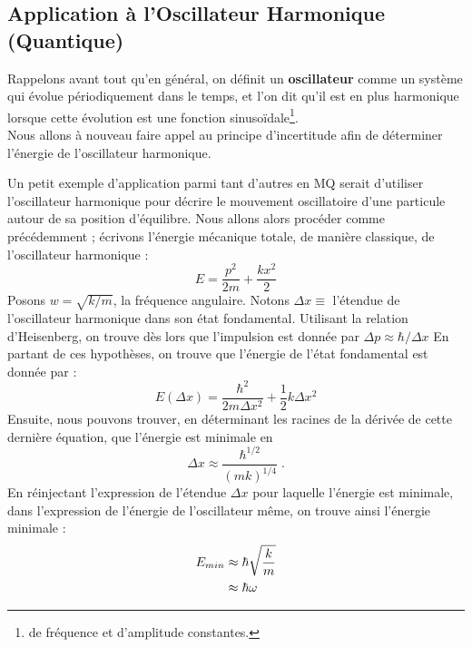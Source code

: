 \documentclass[../Notes de cours]{subfiles}
\begin{document}
\subsection{Application à l'Oscillateur Harmonique (Quantique) }
\label{Application à l'Oscillateur Harmonique Quantique}

Rappelons avant tout qu'en général, on définit un \textbf{oscillateur} comme un système qui évolue périodiquement dans le temps, et l'on dit qu'il est en plus harmonique lorsque cette évolution est une fonction sinusoïdale\footnote{de fréquence et d'amplitude constantes.}. \\
Nous allons à nouveau faire appel au principe d'incertitude afin de déterminer l'énergie de l'oscillateur harmonique. 


Un petit exemple d'application parmi tant d'autres en MQ serait d'utiliser l'oscillateur harmonique pour décrire le mouvement oscillatoire d'une particule autour de sa position d'équilibre. Nous allons alors procéder comme précédemment ; écrivons l'énergie mécanique totale, de manière classique, de l'oscillateur harmonique : \begin{equation}
    \label{Energie OHC}
    E = \frac{p^2}{2m} + \frac{kx^2}{2}
\end{equation}
Posons $w = \sqrt{k/m}$, la fréquence angulaire. 
\newline Notons $\Delta x \equiv$ l'étendue de l'oscillateur harmonique dans son état fondamental. 
\newline Utilisant la relation d'Heisenberg, on trouve dès lors que l'impulsion est donnée par $\Delta p \approx \hbar/\Delta x$
\newline En partant de ces hypothèses, on trouve que l'énergie de l'état fondamental est donnée par : 
\begin{equation}
E \left(\Delta x \right) = \frac{\hbar^2}{2m\Delta x^2} + \frac{1}{2} k \Delta x^2
\end{equation}
Ensuite, nous pouvons trouver, en déterminant les racines de la dérivée de cette dernière équation, que l'énergie est minimale en $$\Delta x \approx \frac{\hbar^{1/2}}{\left(mk\right)^{1/4}}\; .$$ 
En réinjectant l'expression de l'étendue $\Delta x$ pour laquelle l'énergie est minimale, dans l'expression de l'énergie de l'oscillateur même, on trouve ainsi l'énergie minimale : 
\begin{align}
\label{Energie OH}
E_{min} &\approx \hbar \sqrt{\frac{k}{m}} \notag \\
& \approx \hbar \omega 
\end{align}
\end{document}
